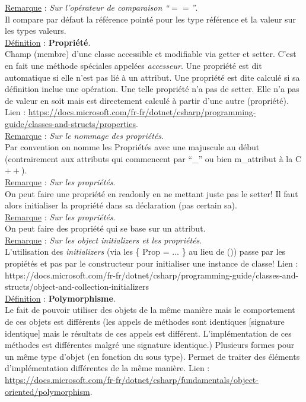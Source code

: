 \documentclass[a4paper,12pt,twoside]{article}
\newcommand{\incode}[1]{{\footnotesize\ttfamily #1}} %
\newcommand{\rem}[2]{\noindent\underline{Remarque} : \textit{#1}.\\ \indent #2}
\newcommand{\defi}[2]{\noindent\underline{Définition} : \textbf{#1}.\\ \indent #2}
\begin{document}
\rem{Sur l'opérateur de comparaison ``$==$''}{Il compare par défaut la référence pointé pour les type référence et la valeur sur les types valeurs.}\\

\defi{Propriété}{Champ (membre) d'une classe accessible et modifiable via \incode{getter} et \incode{setter}. C'est en fait une méthode spéciales appelées \textit{accesseur}. Une propriété est dit automatique si elle n'est pas lié à un attribut. Une propriété est dite calculé si sa définition inclue une opération. Une telle propriété n'a pas de \incode{setter}. Elle n'a pas de valeur en soit mais est directement calculé à partir d'une autre (propriété). Lien : \url{https://docs.microsoft.com/fr-fr/dotnet/csharp/programming-guide/classes-and-structs/properties}.}\\

\rem{Sur le nommage des propriétés}{Par convention on nomme les Propriétés avec une majuscule au début (contrairement aux attributs qui commencent par ``\_'' ou bien \incode{m\_attribut} à la C$++$).}\\

\rem{Sur les propriétés}{On peut faire une propriété en \incode{readonly} en ne mettant juste pas le setter! Il faut alors initialiser la propriété dans sa déclaration (pas certain sa).}\\

\rem{Sur les propriétés}{On peut faire des propriété qui se base sur un attribut.}\\

\rem{Sur les object initializers et les propriétés}{L'utilisation des \textit{initializers} (via les \{ Prop = ... \} au lieu de ()) passe par les propiétés et pas par le constructeur pour initialiser une instance de classe! Lien : https://docs.microsoft.com/fr-fr/dotnet/csharp/programming-guide/classes-and-structs/object-and-collection-initializers}\\

\defi{Polymorphisme}{Le fait de pouvoir utiliser des objets de la même manière mais le comportement de ces objets est différents (les appels de méthodes sont identiques [signature identique] mais le résultats de ces appels est différent. L'implémentation de ces méthodes est différentes malgré une signature identique.) Plusieurs formes pour un même type d'objet (en fonction du sous type). Permet de traiter des éléments d'implémentation différentes de la même manière.  Lien : \url{https://docs.microsoft.com/fr-fr/dotnet/csharp/fundamentals/object-oriented/polymorphism}.}\\
\end{document}
